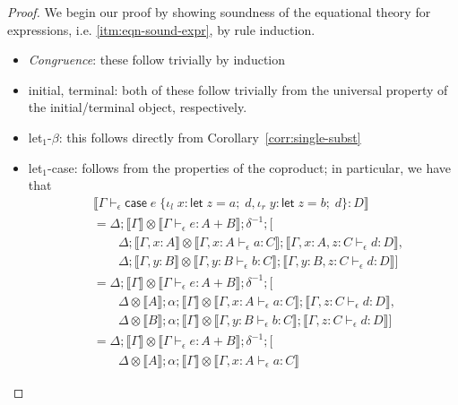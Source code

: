 \documentclass[acmsmall,screen,review]{acmart}
\newcommand{\ms}[1]{\ensuremath{\mathsf{#1}}}
\newcommand{\lto}{:}
\newcommand{\linl}[1]{\iota_l\;{#1}}
\newcommand{\linr}[1]{\iota_r\;{#1}}
\newcommand{\letexpr}[3]{\ensuremath{\ms{let}\;#1 = #2;\;#3}}
\newcommand{\caseexpr}[5]{\ms{case}\;#1\;\{\linl{#2} \lto #3, \linr{#4} \lto #5\}}
\newcommand{\bhyp}[2]{#1 : #2}
\newcommand{\hasty}[4]{#1 \vdash_{#2} #3: {#4}}
\newcommand{\brle}[1]{{\textsf{#1}}}
\newcommand{\dnt}[1]{\llbracket{#1}\rrbracket}
\begin{document}
\begin{proof}
  We begin our proof by showing soundness of the equational theory for expressions, i.e.
  \ref{itm:eqn-sound-expr}, by rule induction.
  \begin{itemize}[leftmargin=*]
    \item \emph{Congruence}: these follow trivially by induction
    \item \brle{initial}, \brle{terminal}: both of these follow trivially from the universal
    property of the initial/terminal object, respectively.
    \item \brle{let$_1$-$\beta$}: this follows directly from Corollary~\ref{corr:single-subst}
    \item \brle{let$_1$-case}: follows from the properties of the coproduct; in particular, we have
    that
    \begin{align*}
      & \dnt{\hasty{\Gamma}{\epsilon}{\caseexpr{e}{x}{\letexpr{z}{a}{d}}{y}{\letexpr{z}{b}{d}}}{D}}
      \\ &= \Delta ; \dnt{\Gamma} \otimes \dnt{\hasty{\Gamma}{\epsilon}{e}{A + B}} ; \delta^{-1} ; [
      \\ & \qquad \Delta
            ; \dnt{\Gamma, \bhyp{x}{A}} \otimes \dnt{\hasty{\Gamma, \bhyp{x}{A}}{\epsilon}{a}{C}}
            ; \dnt{\hasty{\Gamma, \bhyp{x}{A}, \bhyp{z}{C}}{\epsilon}{d}{D}}
            ,
      \\  & \qquad \Delta
            ; \dnt{\Gamma, \bhyp{y}{B}} \otimes \dnt{\hasty{\Gamma, \bhyp{y}{B}}{\epsilon}{b}{C}}
            ; \dnt{\hasty{\Gamma, \bhyp{y}{B}, \bhyp{z}{C}}{\epsilon}{d}{D}}
        ]
      \\ &= \Delta ; \dnt{\Gamma} \otimes \dnt{\hasty{\Gamma}{\epsilon}{e}{A + B}} ; \delta^{-1} ; [
      \\ & \qquad \Delta \otimes \dnt{A} ; \alpha
            ; \dnt{\Gamma} \otimes \dnt{\hasty{\Gamma, \bhyp{x}{A}}{\epsilon}{a}{C}}
            ; \dnt{\hasty{\Gamma, \bhyp{z}{C}}{\epsilon}{d}{D}}
            ,
      \\  & \qquad \Delta \otimes \dnt{B} ; \alpha
            ; \dnt{\Gamma} \otimes \dnt{\hasty{\Gamma, \bhyp{y}{B}}{\epsilon}{b}{C}}
            ; \dnt{\hasty{\Gamma, \bhyp{z}{C}}{\epsilon}{d}{D}}
        ]
      \\ &= \Delta ; \dnt{\Gamma} \otimes \dnt{\hasty{\Gamma}{\epsilon}{e}{A + B}} ; \delta^{-1} ; [
      \\ & \qquad \Delta \otimes \dnt{A} ; \alpha
            ; \dnt{\Gamma} \otimes \dnt{\hasty{\Gamma, \bhyp{x}{A}}{\epsilon}{a}{C}}

\end{align*}
\end{itemize}
\end{proof}
\end{document}
